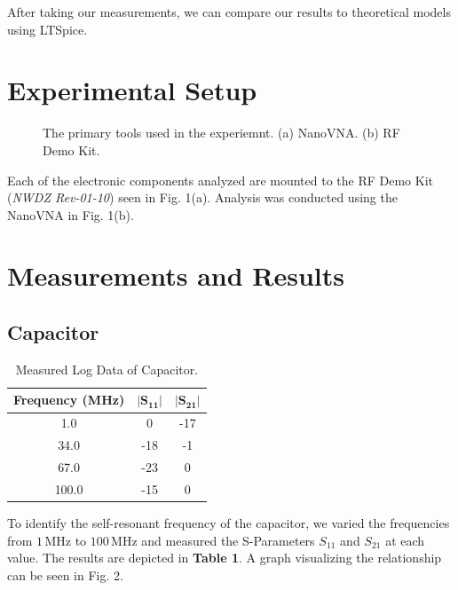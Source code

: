 \documentclass[lettersize,journal]{IEEEtran}
\begin{document}
After taking our measurements, we can compare our results to theoretical models using LTSpice.

\section{Experimental Setup}

\begin{figure}[!t]
\centering
{}
\hfil
{}
\caption{The primary tools used in the experiemnt. (a) NanoVNA. (b) RF Demo Kit.}
\label{fig_sim}
\end{figure}

Each of the electronic components analyzed are mounted to the RF Demo Kit ({\it{NWDZ Rev-01-10}}) seen in Fig. 1(a). Analysis was conducted using the NanoVNA in Fig. 1(b).

\section{Measurements and Results}

\subsection{Capacitor}

\begin{table}
\renewcommand{\arraystretch}{2.2}
\begin{center}
\caption{Measured Log Data of Capacitor.}
\label{tab1}
\begin{tabular}{c c c}
\hline
\bfseries Frequency (MHz) & $\mathbf{|S_{11}|}$ & $\mathbf{|S_{21}|}$\\
\hline
1.0 & 0 & -17\\
\hline
34.0 & -18 & -1\\ 
\hline
67.0 & -23 & 0\\
\hline 
100.0& -15 & 0\\
\hline
\end{tabular}
\end{center}
\end{table}

To identify the self-resonant frequency of the capacitor, we varied the frequencies from $1 \, \text{MHz}$ to $100 \, \text{MHz}$ and measured the S-Parameters $S_{11}$ and $S_{21}$ at each value. The results are depicted in {\bf{Table 1}}. A graph visualizing the relationship can be seen in Fig. 2.
\end{document}
